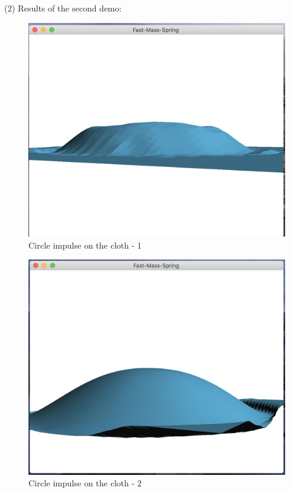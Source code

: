 \documentclass[acmtog]{acmart}
\begin{document}
(2) Results of the second demo:
\begin{figure}[H]
	\centering
	\includegraphics[scale=0.2]{./circle1.png}
	\caption{Circle impulse on the cloth - 1}
\end{figure}

\begin{figure}[H]
	\centering
	\includegraphics[scale=0.2]{./circle2.png}
	\caption{Circle impulse on the cloth - 2}
\end{figure}
\end{document}
